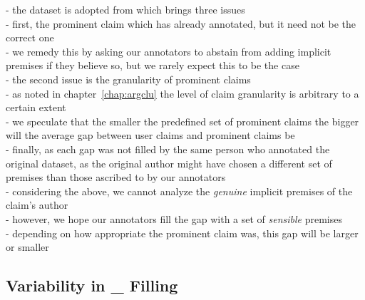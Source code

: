 - the dataset is adopted from \citet{hasan2014you} which brings three issues \\
- first, the prominent claim which has already annotated, but it need not be
the correct one \\
- we remedy this by asking our annotators to abstain from adding implicit premises if 
they believe so, but we rarely expect this to be the case \\
- the second issue is the granularity of prominent claims \\
- as noted in chapter~\ref{chap:argclu} the level of claim granularity is 
arbitrary to a certain extent \\
- we speculate that the smaller the predefined set of prominent claims the 
bigger will the average gap between user claims and prominent claims be \\
- finally, as each gap was not filled by the same person who annotated the original 
dataset, as the original author might have chosen a different set of premises than those
ascribed to by our annotators \\
- considering the above, we cannot analyze the \emph{genuine} implicit premises
of the claim's author \\
- however, we hope our annotators fill the gap with a set of \emph{sensible} premises \\
- depending on how appropriate the prominent claim was, this gap will be larger or smaller \\

\subsection{Variability in \_ Filling} 

